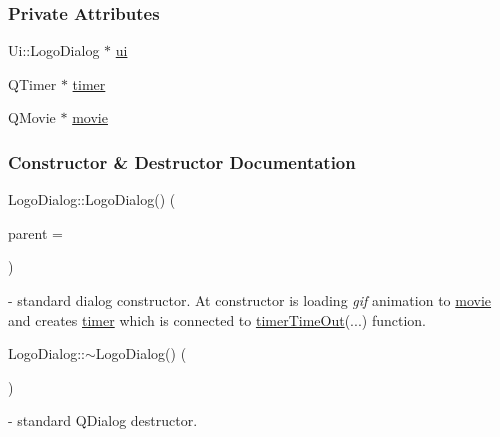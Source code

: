 \subsubsection*{Private Attributes}
\begin{DoxyCompactItemize}
\item 
Ui\+::\+Logo\+Dialog $\ast$ \mbox{\hyperlink{classLogoDialog_a4454a373a68ba6473a55dfd404b52e78}{ui}}
\item 
Q\+Timer $\ast$ \mbox{\hyperlink{classLogoDialog_a0f26a533559a0c055ac7ce2ec9d85273}{timer}}
\item 
Q\+Movie $\ast$ \mbox{\hyperlink{classLogoDialog_a45504b8a8b3fc44056859fcb708c2313}{movie}}
\end{DoxyCompactItemize}


\subsubsection{Constructor \& Destructor Documentation}
\mbox{\label{classLogoDialog_a9457ef5a8c6428bebfa1c56f2d8c9fd1}} 
{\footnotesize\ttfamily Logo\+Dialog\+::\texorpdfstring{Logo\+Dialog()}{LogoDialog()} (\begin{DoxyParamCaption}\item[{Q\+Widget $\ast$}]{parent = {} }\end{DoxyParamCaption})\hspace{0.3cm}{\ttfamily [explicit]}} - standard dialog constructor. At constructor is loading \textit{gif} animation to  \hyperlink{classLogoDialog_a45504b8a8b3fc44056859fcb708c2313}{movie} and creates \hyperlink{classLogoDialog_a0f26a533559a0c055ac7ce2ec9d85273}{timer} which is connected to \hyperlink{classLogoDialog_a7e819a837c81cadaf3cf016b6638b253}{timer\+Time\+Out}(...) function.

\mbox{\label{classLogoDialog_a956fbb52cdf488707c5f5a1877727c27}} 
{\footnotesize\ttfamily Logo\+Dialog\+::\texorpdfstring{$\sim$\+Logo\+Dialog()}{~LogoDialog()} (\begin{DoxyParamCaption}{ }\end{DoxyParamCaption})} - standard Q\+Dialog destructor.




